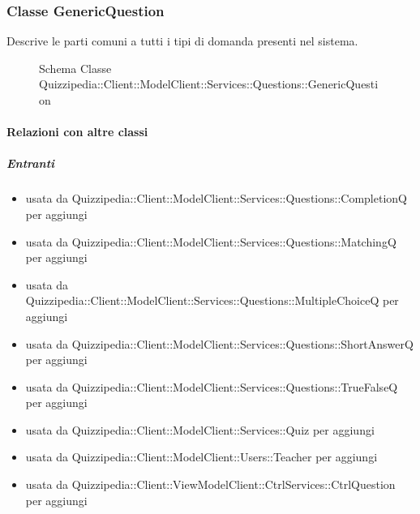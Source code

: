 \subsubsection{Classe GenericQuestion}
Descrive le parti comuni a tutti i tipi di domanda presenti nel sistema.
\begin{figure}[H]
\centering
\noindent{}
\caption[Schema Classe GenericQuestion]{Schema Classe Quizzipedia::Client::ModelClient::Services::Questions::GenericQuestion}
\end{figure}
\paragraph{Relazioni con altre classi}
\subparagraph{Entranti}
\begin{itemize}
\item usata da Quizzipedia::Client::ModelClient::Services::Questions::CompletionQ per aggiungi
\item usata da Quizzipedia::Client::ModelClient::Services::Questions::MatchingQ per aggiungi
\item usata da Quizzipedia::Client::ModelClient::Services::Questions::MultipleChoiceQ per aggiungi
\item usata da Quizzipedia::Client::ModelClient::Services::Questions::ShortAnswerQ per aggiungi
\item usata da Quizzipedia::Client::ModelClient::Services::Questions::TrueFalseQ per aggiungi
\item usata da Quizzipedia::Client::ModelClient::Services::Quiz per aggiungi
\item usata da Quizzipedia::Client::ModelClient::Users::Teacher per aggiungi
\item usata da Quizzipedia::Client::ViewModelClient::CtrlServices::CtrlQuestion per aggiungi
\end{itemize}
